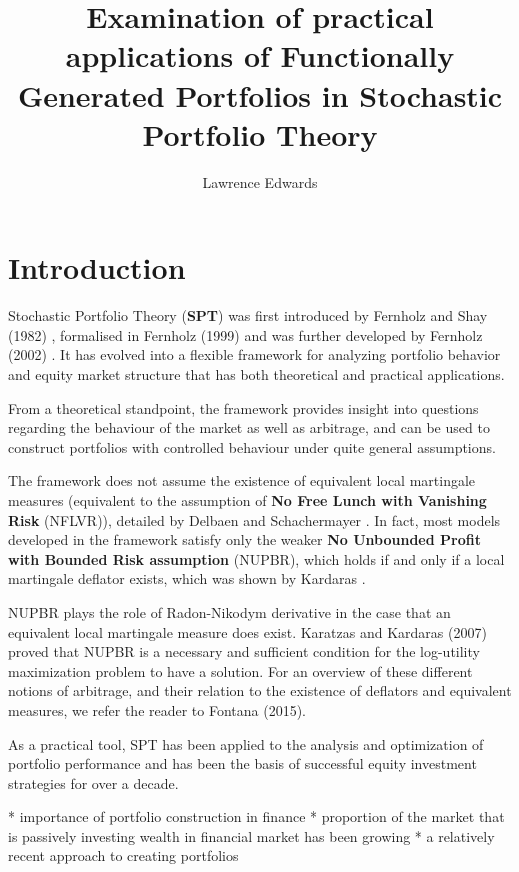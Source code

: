 \documentclass[british]{amsart}
\numberwithin{equation}{section}
\numberwithin{figure}{section}
\theoremstyle{plain}
\theoremstyle{definition}
\theoremstyle{plain}
\theoremstyle{plain}
\theoremstyle{plain}
\theoremstyle{remark}
\begin{document}
\title{Examination of practical applications of Functionally Generated 
Portfolios in Stochastic Portfolio Theory}
\author{Lawrence Edwards}
\maketitle

\tableofcontents{}

\section{Introduction}
Stochastic Portfolio Theory (\textbf{SPT}) was first introduced by Fernholz and 
Shay (1982) \cite{fernholz1982}, formalised in Fernholz (1999) 
\cite{fernholz1999} and was further developed by Fernholz (2002) 
\cite{fernholz2002}. It has evolved into a flexible framework for analyzing 
portfolio behavior and equity market structure that has both theoretical and 
practical applications.

From a theoretical standpoint, the framework provides insight into questions 
regarding the behaviour of the market as well as arbitrage, and can be used to 
construct portfolios with controlled behaviour under quite general assumptions. 

The framework does not assume the existence of equivalent local martingale
measures (equivalent to the assumption of \textbf{No Free Lunch with Vanishing 
Risk} (NFLVR)), detailed by Delbaen and Schachermayer \cite{delbaen1994}. In 
fact, most models developed in the framework satisfy only the weaker \textbf{No 
Unbounded Profit with Bounded Risk assumption} (NUPBR), which holds if and only 
if a local martingale deflator exists, which was shown by Kardaras 
\cite{kardaras2012}. 

NUPBR plays the role of Radon-Nikodym derivative in the case that an equivalent
local martingale measure does exist.  Karatzas and Kardaras (2007) proved that 
NUPBR is a necessary and sufficient condition for the log-utility maximization 
problem to have a solution. For an overview of these different notions of 
arbitrage, and their relation to the existence of deflators and equivalent 
measures, we refer the reader to Fontana (2015).

As a practical tool, SPT has been applied to the analysis and optimization of 
portfolio performance and has been the basis of successful equity investment 
strategies for over a decade.

* importance of portfolio construction in finance
* proportion of the market that is passively investing wealth in financial 
market has been growing
* a relatively recent approach to creating portfolios
\end{document}
